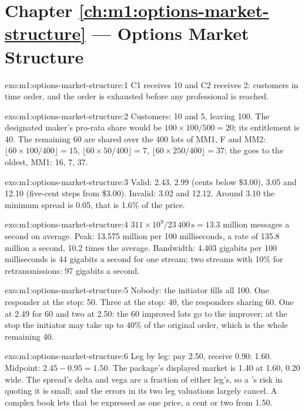 \section*{Chapter \ref{ch:m1:options-market-structure} --- Options Market Structure}

\begin{solution}{exo:m1:options-market-structure:1}
C1 receives 10 and C2 receives 2: customers in time order, and the order is
exhausted before any professional is reached.
\end{solution}

\begin{solution}{exo:m1:options-market-structure:2}
Customers: 10 and 5, leaving 100. The designated maker's pro-rata share would
be $100 \times 100/500 = 20$; its entitlement is 40. The remaining 60 are
shared over the 400 lots of MM1, F and MM2: $\lfloor 60 \times 100/400\rfloor
= 15$, $\lfloor 60 \times 50/400\rfloor = 7$, $\lfloor 60 \times 250/400\rfloor
= 37$; the  goes to the oldest, MM1: 16, 7, 37.
\end{solution}

\begin{solution}{exo:m1:options-market-structure:3}
Valid: 2.43, 2.99 (cents below \$3.00), 3.05 and 12.10 (five-cent steps from
\$3.00). Invalid: 3.02 and 12.12. Around 3.10 the minimum spread is 0.05, that
is 1.6\% of the price.
\end{solution}

\begin{solution}{exo:m1:options-market-structure:4}
$311 \times 10^9 / 23\,400\,\text{s} = 13.3$ million messages a second on
average. Peak: 13.575 million per 100 milliseconds, a rate of 135.8 million a
second, 10.2 times the average. Bandwidth: 4.403 gigabits per 100 milliseconds
is 44 gigabits a second for one stream; two streams with 10\% for
retransmissions: 97 gigabits a second.
\end{solution}

\begin{solution}{exo:m1:options-market-structure:5}
Nobody: the initiator fills all 100. One responder at the stop: 50. Three at
the stop: 40, the responders sharing 60. One at 2.49 for 60 and two at 2.50:
the 60 improved lots go to the improver; at the stop the initiator may take
up to 40\% of the original order, which is the whole remaining 40.
\end{solution}

\begin{solution}{exo:m1:options-market-structure:6}
Leg by leg: pay 2.50, receive 0.90: 1.60. Midpoint: $2.45 - 0.95 = 1.50$. The
package's displayed market is 1.40 at 1.60, 0.20 wide. The spread's delta and
vega are a fraction of either leg's, so a 's risk in quoting it
is small; and the errors in its two leg valuations largely cancel. A complex
book lets that be expressed as one price, a cent or two from 1.50.
\end{solution}

